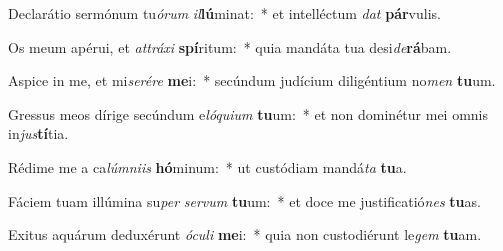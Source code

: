 \item Declarátio sermónum tu\textit{ó}\textit{rum} \textit{il}\textbf{lú}minat:~* et intelléctum \textit{dat} \textbf{pár}vulis.
\item Os meum apérui, et \textit{at}\textit{trá}\textit{xi} \textbf{spí}ritum:~* quia mandáta tua desi\textit{de}\textbf{rá}bam.
\item Aspice in me, et mi\textit{se}\textit{ré}\textit{re} \textbf{me}i:~* secúndum judícium diligéntium no\textit{men} \textbf{tu}um.
\item Gressus meos dírige secúndum e\textit{ló}\textit{qui}\textit{um} \textbf{tu}um:~* et non dominétur mei omnis in\textit{jus}\textbf{tí}tia.
\item Rédime me a ca\textit{lúm}\textit{ni}\textit{is} \textbf{hó}minum:~* ut custódiam mandá\textit{ta} \textbf{tu}a.
\item Fáciem tuam illúmina su\textit{per} \textit{ser}\textit{vum} \textbf{tu}um:~* et doce me justificatió\textit{nes} \textbf{tu}as.
\item Exitus aquárum deduxérunt \textit{ó}\textit{cu}\textit{li} \textbf{me}i:~* quia non custodiérunt le\textit{gem} \textbf{tu}am.
